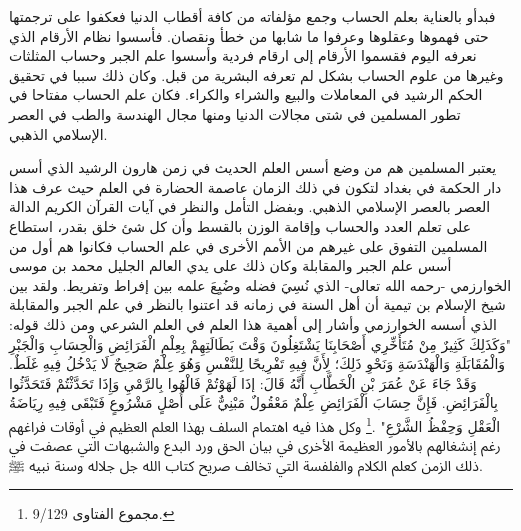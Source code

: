 فبدأو بالعناية بعلم الحساب وجمع مؤلفاته من كافة أقطاب الدنيا فعكفوا على ترجمتها حتى فهموها وعقلوها وعرفوا ما شابها من خطأ ونقصان. فأسسوا نظام الأرقام الذي نعرفه اليوم فقسموا الأرقام إلى ارقام فردية وأسسوا علم الجبر وحساب المثلثات وغيرها من علوم الحساب بشكل لم تعرفه البشرية من قبل. وكان ذلك سببا في تحقيق الحكم الرشيد في المعاملات والبيع والشراء والكراء. فكان علم الحساب مفتاحا في تطور المسلمين في شتى مجالات الدنيا ومنها مجال الهندسة والطب في العصر الإسلامي الذهبي.

يعتبر المسلمين هم من وضع أسس العلم الحديث في زمن هارون الرشيد الذي أسس دار الحكمة في بغداد لتكون في ذلك الزمان عاصمة الحضارة في العلم حيث عرف هذا العصر بالعصر الإسلامي الذهبي. وبفضل التأمل والنظر في آيات القرآن الكريم الدالة على تعلم العدد والحساب وإقامة الوزن بالقسط وأن كل شئ خلق بقدر، استطاع المسلمين التفوق على غيرهم من الأمم الأخرى في علم الحساب فكانوا هم أول من أسس علم الجبر والمقابلة وكان ذلك على يدي العالم الجليل محمد بن موسى الخوارزمي -رحمه الله تعالى- الذي نُسِيَ فضله وضُيِعَ علمه بين إفراط وتفريط. ولقد بين شيخ الإسلام بن تيمية أن أهل السنة في زمانه قد اعتنوا بالنظر في علم الجبر والمقابلة الذي أسسه الخوارزمي وأشار إلى أهمية هذا العلم في العلم الشرعي ومن ذلك قوله: 
"وَكَذَلِكَ كَثِيرٌ مِنْ مُتَأَخِّرِي أَصْحَابِنَا يَشْتَغِلُونَ وَقْتَ بَطَالَتِهِمْ بِعِلْمِ الْفَرَائِضِ وَالْحِسَابِ وَالْجَبْرِ وَالْمُقَابَلَةِ وَالْهَنْدَسَةِ وَنَحْوِ ذَلِكَ؛ لِأَنَّ فِيهِ تَفْرِيحًا لِلنَّفْسِ وَهُوَ عِلْمٌ صَحِيحٌ لَا يَدْخُلُ فِيهِ غَلَطٌ. وَقَدْ جَاءَ عَنْ عُمَرَ بْنِ الْخَطَّابِ أَنَّهُ قَالَ: إذَا لَهَوْتُمْ فَالْهُوا بِالرَّمْيِ وَإِذَا تَحَدَّثْتُمْ فَتَحَدَّثُوا بِالْفَرَائِضِ. فَإِنَّ حِسَابَ الْفَرَائِضِ عِلْمٌ مَعْقُولٌ مَبْنِيٌّ عَلَى أَصْلٍ مَشْرُوعٍ فَتَبْقَى فِيهِ رِيَاضَةُ الْعَقْلِ وَحِفْظُ الشَّرْعِ" \href{https://shamela.ws/book/7289/4394#p1}{\faExternalLink} \cite{ibnTaimia_Majmoo}.\footnote{مجموع الفتاوى 9/129.} وكل هذا فيه اهتمام السلف بهذا العلم العظيم في أوقات فراغهم رغم إنشغالهم بالأمور العظيمة الأخرى في بيان الحق ورد البدع والشبهات التي عصفت في ذلك الزمن كعلم الكلام والفلفسة التي تخالف صريح كتاب الله جل جلاله وسنة نبيه ﷺ.

